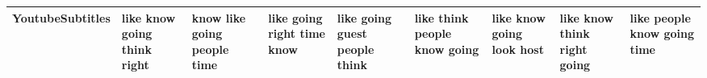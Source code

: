 \documentclass[11pt,a4paper]{article}
\begin{document}
\begin{appendices}
\begin{table*}[htp]
\begin{tiny}
\begin{tabular}{|p{}|p{}|p{}|p{}|p{}|p{}|p{}|p{}|p{}|}
YoutubeSubtitles & like \newline know \newline going \newline think \newline right & know \newline like \newline going \newline people \newline time & like \newline going \newline right \newline time \newline know & like \newline going \newline guest \newline people \newline think & like \newline think \newline people \newline know \newline going & like \newline know \newline going \newline look \newline host & like \newline know \newline think \newline right \newline going & like \newline people \newline know \newline going \newline time\\\hline

\end{tabular}
\end{tiny}
\end{table*}
\end{appendices}
\end{document}
